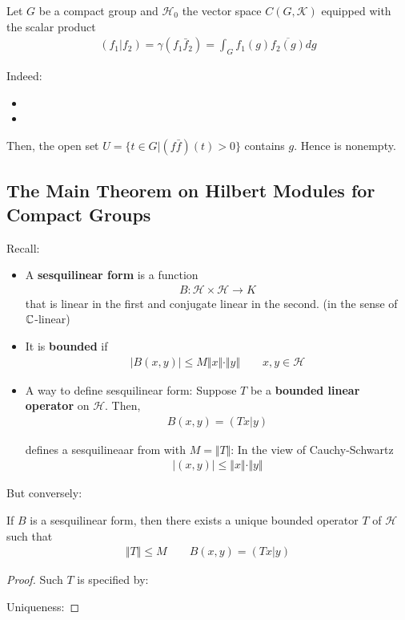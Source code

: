 \documentclass[Total.tex]{subfiles}
\begin{document}
				\begin{example}
					Let $G$ be a compact group and $\mathcal{H}_0$ the vector space $C(G,\mathcal{K})$ equipped with the scalar product
					\begin{gather*}
						(f_1|f_2)=\gamma(f_1\bar{f}_2)=\int_G f_1(g)\overline{f_2(g)}dg
					\end{gather*}
					
					Indeed:
					\begin{itemize}
						\item 
						\item 
					\end{itemize}
					
					Then, the open set $U=\{t\in G|(f\bar{f})(t)>0\}$ contains $g$. Hence is nonempty.
				\end{example}
				\subsection{The Main Theorem on Hilbert Modules for Compact Groups}
					Recall:
					\begin{itemize}
						\item A \textbf{sesquilinear form} is a function
						\begin{gather*}
							B:\mathcal{H}\times \mathcal{H}\rightarrow K
						\end{gather*}
						that is linear in the first and conjugate linear in the second. (in the sense of $\mathbb{C}$-linear)
						\item  It is \textbf{bounded} if 
						\begin{gather*}
							|B(x,y)|\leq M\Vert x\Vert\cdot \Vert y\Vert\qquad x,y\in \mathcal{H}
						\end{gather*}
						\item A way to define sesquilinear form: Suppose $T$ be a \textbf{bounded linear operator} on $\mathcal{H}$. Then,
						\begin{gather*}
							B(x,y)=(Tx|y)
						\end{gather*}
						
						defines a sesquilineaar from with $M=\Vert T\Vert$: In the view of Cauchy-Schwartz
						\begin{gather*}
							|(x,y)|\leq \Vert x\Vert\cdot \Vert y\Vert 
						\end{gather*}
					\end{itemize}
					But conversely:
					\begin{lemma}
						If $B$ is a sesquilinear form, then there exists a unique bounded operator $T$ of $\mathcal{H}$ such that
						\begin{gather*}
							\Vert T\Vert\leq M\qquad B(x,y)=(Tx|y)
						\end{gather*}
					\end{lemma}
					\begin{proof}
						Such $T$ is specified by:
						
						Uniqueness:
					\end{proof}
					
\end{document}
